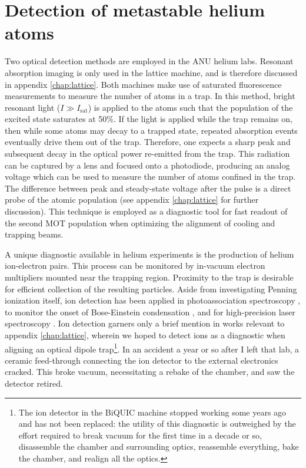 \section{Detection of metastable helium atoms}
\label{sec:he_detection}
	Two optical detection methods are employed in the ANU helium labs.
	Resonant absorption imaging is only used in the lattice machine, and is therefore discussed in appendix \ref{chap:lattice}.
	Both machines make use of saturated fluorescence measurements to measure the number of atoms in a trap.
	In this method, bright resonant light ($I\gg I_\textrm{sat}$) is applied to the atoms such that the population of the excited state saturates at 50\%.
	If the light is applied while the trap remains on, then while some atoms may decay to a trapped state, repeated absorption events eventually drive them out of the trap.
	Therefore, one expects a sharp peak and subsequent decay in the optical power re-emitted from the trap.
	This radiation can be captured by a lens and focused onto a photodiode, producing an analog voltage which can be used to measure the number of atoms confined in the trap.
	The difference between peak and steady-state voltage after the pulse is a direct probe of the atomic population (see appendix \ref{chap:lattice} for further discussion).
	This technique is employed as a diagnostic tool for fast readout of the second MOT population when optimizing the alignment of cooling and trapping beams. 

	A unique diagnostic available in helium experiments is the production of helium ion-electron pairs.
	This process can be monitored by in-vacuum electron multipliers mounted near the trapping region.
	Proximity to the trap is desirable for efficient collection of the resulting particles.
	Aside from investigating Penning ionization itself, ion detection has been applied in photoassociation spectroscopy \cite{Herschbach00,Koelemeij04}, to monitor the onset of Bose-Einstein condensation \cite{Tychkov06}, and for high-precision laser spectroscopy \cite{Rengelink18}.
	Ion detection garners only a brief mention in works relevant to appendix \ref{chap:lattice}, wherein we hoped to detect ions as a diagnostic when aligning an optical dipole trap\footnote{The ion detector in the BiQUIC machine stopped working some years ago and has not been replaced: the utility of this diagnostic is outweighed by the effort required to break vacuum for the first time in a decade or so, disassemble the chamber and surrounding optics, reassemble everything, bake the chamber, and realign all the optics.}.
	In an accident a year or so after I left that lab, a ceramic feed-through connecting the ion detector to the external electronics cracked.
	This broke vacuum, necessitating a rebake of the chamber, and saw the detector retired.
	


